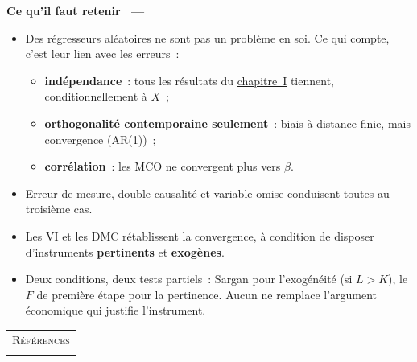 \documentclass[10pt,a4paper]{article}
\makeatletter
\newcommand{\siteurl}{https://le-mans.adjemian.eu/econometrics}
\newcommand{\chapref}[2]{\href{\siteurl/chapitre-#1.pdf}{chapitre~#2}}
\theoremstyle{definition}
\renewcommand{\newline}{\unskip\par\vspace{1.5pt}}
\newenvironment{frame}[1][]{\par}{\par}
\newcommand{\frameheadrule}{%
  \par\nobreak\vspace{1pt}{\color{ctitle}\hrule height 0.6pt}\nobreak\vspace{4pt}}
\newcommand{\frametitle}[1]{%
  \par\addvspace{8pt plus 2pt}\needspace{6\baselineskip}%
  \noindent\begingroup\color{ctitle}\sffamily\bfseries\large #1\endgroup
  \@ifnextchar\framesubtitle{}{\frameheadrule}}
\newcommand{\framesubtitle}[1]{%
  \begingroup\color{ctitle}\sffamily\normalsize\ --- #1\endgroup\frameheadrule}
\makeatother
\begin{document}
\begin{frame}
  \frametitle{Ce qu'il faut retenir}

  \begin{itemize}

  \item Des régresseurs aléatoires ne sont pas un problème en soi. Ce qui
    compte, c'est leur lien avec les erreurs~:
    \begin{itemize}
    \item \textbf{indépendance}~: tous les résultats du \chapref{1}{I} tiennent,
      conditionnellement à $X$~;
    \item \textbf{orthogonalité contemporaine seulement}~: biais à distance
      finie, mais convergence (AR(1))~;
    \item \textbf{corrélation}~: les MCO ne convergent plus vers $\beta$.
    \end{itemize}

  \item Erreur de mesure, double causalité et variable omise conduisent toutes
    au troisième cas.\newline

  \item Les VI et les DMC rétablissent la convergence, à condition de disposer
    d'instruments \textbf{pertinents} et \textbf{exogènes}.\newline

  \item[\dbend] Deux conditions, deux tests partiels~: Sargan pour l'exogénéité
    (si $L>K$), le $F$ de première étape pour la pertinence. Aucun ne remplace
    l'argument économique qui justifie l'instrument.

  \end{itemize}

\end{frame}


\begin{notes}

  \begin{center}
    \begin{tabular}{c}
      \\
      \Huge{\textsc{Références}}\\
      \\
    \end{tabular}
  \end{center}

  \bigskip

  \nocite{Greene2017}

  \nocite{Schmidt1976}


\end{notes}
\end{document}
